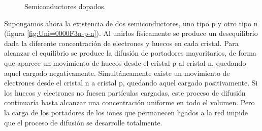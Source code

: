 %
\begin{figure}

\caption{Semiconductores dopados.}



\end{figure}


Supongamos ahora la existencia de dos semiconductores, uno tipo p
y otro tipo n (figura \ref{fig:Uni=0000F3n-p-n}). Al unirlos físicamente
se produce un desequilibrio dada la diferente concentración de electrones
y huecos en cada cristal. Para alcanzar el equilibrio se produce la
difusión de portadores mayoritarios, de forma que aparece un movimiento
de huecos desde el cristal p al cristal n, quedando aquel cargado
negativamente. Simultáneamente existe un movimiento de electrones
desde el cristal n a cristal p, quedando aquel cargado positivamente.
Si los huecos y electrones no fuesen partículas cargadas, este proceso
de difusión continuaría hasta alcanzar una concentración uniforme
en todo el volumen. Pero la carga de los portadores de los iones que
permanecen ligados a la red impide que el proceso de difusión se desarrolle
totalmente. 

